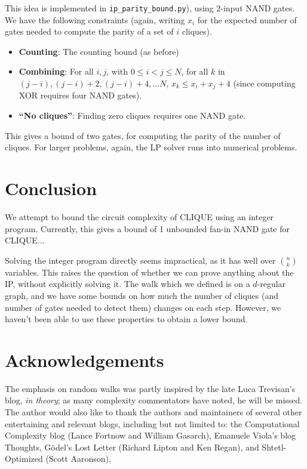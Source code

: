 \documentclass[12pt]{article}
\theoremstyle{definition}
\begin{document}
This idea is implemented in {\tt ip\_parity\_bound.py}), using 2-input NAND gates.
We have the following constraints (again, writing $x_i$ for the expected number
of gates needed to compute the parity of a set of $i$ cliques).

\begin{itemize}

\item {\bf Counting}: The counting bound (as before)

\item {\bf Combining}: For all $i, j$, with $0 \le i < j \le N$, for
all $k$ in $(j-i), (j-i)+2, (j-i)+4, ... N$, $x_k \le x_i + x_j + 4$ (since
computing XOR requires four NAND gates).

\item {\bf ``No cliques''}: Finding zero cliques requires one NAND gate.

\end{itemize}

This gives a bound of two gates, for computing the parity of
the number of cliques. For larger problems, again, the LP solver runs into
numerical problems.

\section{Conclusion}

We attempt to bound the circuit complexity of CLIQUE using an integer program.
Currently, this gives a bound
of 1 unbounded fan-in NAND gate for CLIQUE...

Solving the integer program directly seems impractical, as it has well over
${n \choose k}$ variables. This raises the question of whether we can prove
anything about the IP, without explicitly solving it.
The walk which we defined is on a $d$-regular graph, and we have some bounds on
how much the number of cliques (and number of gates needed to detect them)
changes on each step. However, we haven't been able to use these properties
to obtain a lower bound.

\section{Acknowledgements}

The emphasis on random walks was partly inspired by the late Luca
Trevisan's blog, {\em in theory}; as many complexity commentators
have noted, he will be missed. The author would also like to thank
the authors and maintainers of several other entertaining and
relevant blogs, including but not limited to: the Computational
Complexity blog (Lance Fortnow and William Gasarch), Emanuele Viola's
blog Thoughts, G\"odel's Lost Letter (Richard Lipton and Ken Regan),
and Shtetl-Optimized (Scott Aaronson),



\end{document}
